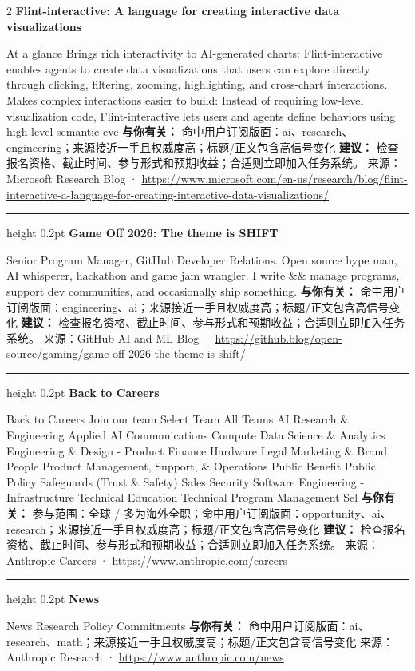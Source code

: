 \documentclass[10.5pt]{ctexart}
\begin{document}
\begin{multicols}{2}
{\large\bfseries Flint-interactive: A language for creating interactive data visualizations}\par
At a glance Brings rich interactivity to AI-generated charts: Flint-interactive enables agents to create data visualizations that users can explore directly through clicking, filtering, zooming, highlighting, and cross-chart interactions. Makes complex interactions easier to build: Instead of requiring low-level visualization code, Flint-interactive lets users and agents define behaviors using high-level semantic eve
\textbf{与你有关：} 命中用户订阅版面：ai、research、engineering；来源接近一手且权威度高；标题/正文包含高信号变化
\textbf{建议：} 检查报名资格、截止时间、参与形式和预期收益；合适则立即加入任务系统。
{\footnotesize\color{ormuted} 来源：Microsoft Research Blog · \url{https://www.microsoft.com/en-us/research/blog/flint-interactive-a-language-for-creating-interactive-data-visualizations/}}
\vspace{2mm}
\hrule height 0.2pt
\vspace{2mm}
{\large\bfseries Game Off 2026: The theme is SHIFT}\par
Senior Program Manager, GitHub Developer Relations. Open source hype man, AI whisperer, hackathon and game jam wrangler. I write \&\& manage programs, support dev communities, and occasionally ship something.
\textbf{与你有关：} 命中用户订阅版面：engineering、ai；来源接近一手且权威度高；标题/正文包含高信号变化
\textbf{建议：} 检查报名资格、截止时间、参与形式和预期收益；合适则立即加入任务系统。
{\footnotesize\color{ormuted} 来源：GitHub AI and ML Blog · \url{https://github.blog/open-source/gaming/game-off-2026-the-theme-is-shift/}}
\vspace{2mm}
\hrule height 0.2pt
\vspace{2mm}
{\large\bfseries Back to Careers}\par
Back to Careers Join our team Select Team All Teams AI Research \& Engineering Applied AI Communications Compute Data Science \& Analytics Engineering \& Design - Product Finance Hardware Legal Marketing \& Brand People Product Management, Support, \& Operations Public Benefit Public Policy Safeguards (Trust \& Safety) Sales Security Software Engineering - Infrastructure Technical Education Technical Program Management Sel
\textbf{与你有关：} 参与范围：全球 / 多为海外全职；命中用户订阅版面：opportunity、ai、research；来源接近一手且权威度高；标题/正文包含高信号变化
\textbf{建议：} 检查报名资格、截止时间、参与形式和预期收益；合适则立即加入任务系统。
{\footnotesize\color{ormuted} 来源：Anthropic Careers · \url{https://www.anthropic.com/careers}}
\vspace{2mm}
\hrule height 0.2pt
\vspace{2mm}
{\large\bfseries News}\par
News Research Policy Commitments
\textbf{与你有关：} 命中用户订阅版面：ai、research、math；来源接近一手且权威度高；标题/正文包含高信号变化
{\footnotesize\color{ormuted} 来源：Anthropic Research · \url{https://www.anthropic.com/news}}
\end{multicols}
\end{document}
